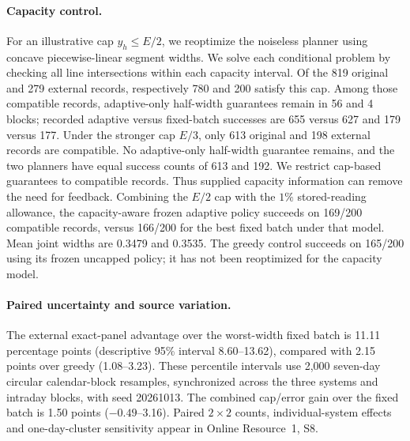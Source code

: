 \paragraph{Capacity control.}
For an illustrative cap $y_h\leq E/2$, we reoptimize the noiseless planner
using concave piecewise-linear segment widths. We solve each conditional
problem by checking all line intersections within each capacity interval.
Of the 819 original and 279 external records, respectively 780 and 200 satisfy
this cap. Among those compatible records, adaptive-only half-width guarantees
remain in 56 and 4 blocks; recorded adaptive versus fixed-batch successes
are 655 versus 627 and 179 versus 177. Under the stronger cap $E/3$, only
613 original and 198 external records are compatible. No adaptive-only
half-width guarantee remains, and the two planners have equal success counts
of 613 and 192. We restrict cap-based guarantees to compatible records.
Thus supplied capacity information can remove the need for feedback.
Combining the $E/2$ cap with the $1\%$ stored-reading allowance, the
capacity-aware frozen adaptive policy succeeds on 169/200 compatible records,
versus 166/200 for the best fixed batch under that model. Mean joint widths
are 0.3479 and 0.3535. The greedy control succeeds on 165/200 using its
frozen uncapped policy; it has not been reoptimized for the capacity model.

\paragraph{Paired uncertainty and source variation.}
The external exact-panel advantage over the worst-width fixed batch is
11.11 percentage points (descriptive 95\% interval 8.60--13.62), compared
with 2.15 points over greedy (1.08--3.23). These percentile intervals use
2,000 seven-day circular calendar-block resamples, synchronized across the
three systems and intraday blocks, with seed 20261013. The combined cap/error
gain over the fixed batch is 1.50 points ($-0.49$--3.16). Paired $2\times2$
counts, individual-system effects and one-day-cluster sensitivity appear in
Online Resource~1, S8.
